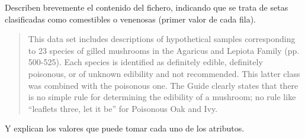 Describen brevemente el contenido del fichero, indicando que se trata de setas clasificadas como comestibles o venenosas (primer valor de cada fila).
\begin{quote}
\label{cita:incertidumbre-suprimida-en-mushroom}
   This data set includes descriptions of hypothetical samples corresponding to 23 species of gilled mushrooms in the Agaricus and Lepiota Family (pp. 500-525). Each species is identified as definitely edible, definitely poisonous, or of unknown edibility and not recommended. This latter class was combined with the poisonous one. The Guide clearly states that there is no simple rule for determining the edibility of a mushroom; no rule like ``leaflets three, let it be'' for Poisonous Oak and Ivy.
\end{quote}
\noindent Y explican los valores que puede tomar cada uno de los atributos.
